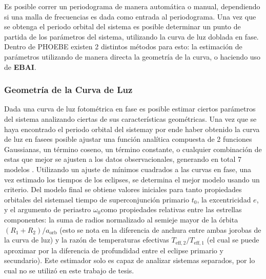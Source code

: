 Es posible correr un periodograma de manera automática o manual, dependiendo si
una malla de frecuencias es dada como entrada al periodograma. Una vez que se
obtenga el periodo orbital del sistema es posible determinar un punto de partida
de los parámetros del sistema, utilizando la curva de luz doblada en fase.
Dentro de PHOEBE existen 2 distintos métodos para esto: la estimación de
parámetros utilizando de manera directa la geometría de la curva, o haciendo uso
de \textbf{EBAI}.

\subsubsection{Geometría de la Curva de Luz}
Dada una curva de luz fotométrica en fase es posible estimar ciertos parámetros
del sistema analizando ciertas de sus características geométricas. Una vez que
se haya encontrado el periodo orbital del sistema\textemdash y por ende haber
obtenido la curva de luz en fase\textemdash es posible ajustar una función
analítica compuesta de 2 funciones Gaussianas, un término coseno, un término
constante, o cualquier combinación de estas que mejor se ajusten a los datos
observacionales, generando en total 7 modelos
\autocite{conroy_phoebe_v_framework_solving_inverse_problem_2020}. Utilizando un
ajuste de mínimos cuadrados a las curvas en fase, una vez estimado los tiempos
de los eclipses, se determina el mejor modelo usando un criterio. Del modelo
final se obtiene valores iniciales para tanto propiedades orbitales del
sistema\textemdash el tiempo de superconjunción primario $t_0$, la excentricidad
$e$, y el argumento de periastro $\omega_0$\textemdash como propiedades
relativas entre las estrellas componentes: la suma de radios normalizado al
semieje mayor de la órbita $(R_1 + R_2)/a_{\mathrm{orb}}$ (esto se nota en la
diferencia de anchura entre ambas jorobas de la curva de luz) y la razón de
temperaturas efectivas $T_{\mathrm{eff},2}/T_{\mathrm{eff},1}$ (el cual se puede
aproximar por la diferencia de profundidad entre el eclipse primario y
secundario). Este estimador solo es capaz de analizar sistemas separados, por lo
cual no se utilizó en este trabajo de tesis.

